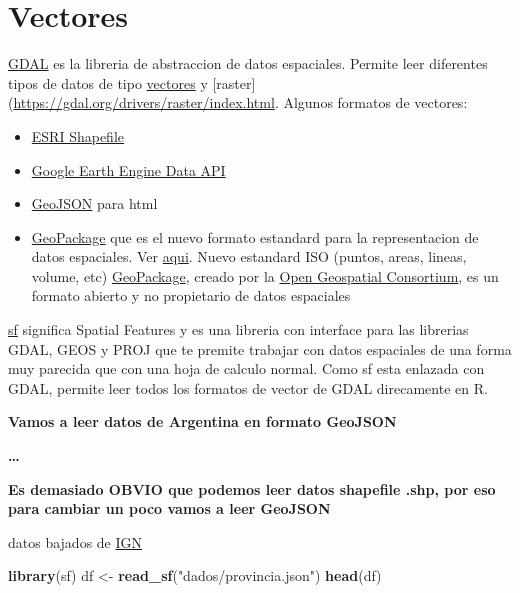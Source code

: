 \documentclass[]{book}
\newenvironment{Shaded}{\begin{snugshade}}{\end{snugshade}}
\newcommand{\KeywordTok}[1]{\textcolor[rgb]{0.13,0.29,0.53}{\textbf{#1}}}
\newcommand{\NormalTok}[1]{#1}
\newcommand{\StringTok}[1]{\textcolor[rgb]{0.31,0.60,0.02}{#1}}
\providecommand{\tightlist}{%
  \setlength{\itemsep}{0pt}\setlength{\parskip}{0pt}}
\begin{document}
\hypertarget{vectores}{%
\section{Vectores}\label{vectores}}

\href{https://gdal.org/}{GDAL} es la libreria de abstraccion de datos espaciales. Permite leer diferentes tipos de datos de tipo \href{https://gdal.org/drivers/vector/index.html}{vectores} y {[}raster{]}(\url{https://gdal.org/drivers/raster/index.html}. Algunos formatos de vectores:

\begin{itemize}
\tightlist
\item
  \href{https://gdal.org/drivers/vector/shapefile.html}{ESRI Shapefile}
\item
  \href{https://gdal.org/drivers/vector/eeda.html}{Google Earth Engine Data API}
\item
  \href{https://gdal.org/drivers/vector/geojson.html}{GeoJSON} para html
\item
  \href{https://gdal.org/drivers/vector/gpkg.html}{GeoPackage} que es el nuevo formato estandard para la representacion de datos espaciales. Ver \href{https://en.wikipedia.org/wiki/GeoPackage}{aqui}. Nuevo estandard ISO (puntos, areas, lineas, volume, etc) \href{https://en.wikipedia.org/wiki/GeoPackage}{GeoPackage}, creado por la \href{https://www.opengeospatial.org/standards/geopackage}{Open Geospatial Consortium}, es un formato abierto y no propietario de datos espaciales
\end{itemize}

\href{https://github.com/r-spatial/sf}{sf} significa Spatial Features y es una libreria con interface para las librerias GDAL, GEOS y PROJ que te premite trabajar con datos espaciales de una forma muy parecida que con una hoja de calculo normal.
Como sf esta enlazada con GDAL, permite leer todos los formatos de vector de GDAL direcamente en R.

\textbf{Vamos a leer datos de Argentina en formato GeoJSON}

\textbf{\ldots{}}

\textbf{Es demasiado OBVIO que podemos leer datos shapefile .shp, por eso para cambiar un poco vamos a leer GeoJSON}

datos bajados de \href{http://www.ign.gob.ar/NuestrasActividades/InformacionGeoespacial/CapasSIG}{IGN}

\begin{Shaded}
\begin{Highlighting}[]
\KeywordTok{library}\NormalTok{(sf)}
\NormalTok{df <-}\StringTok{ }\KeywordTok{read_sf}\NormalTok{(}\StringTok{"dados/provincia.json"}\NormalTok{)}
\KeywordTok{head}\NormalTok{(df)}
\end{Highlighting}
\end{Shaded}
\end{document}
